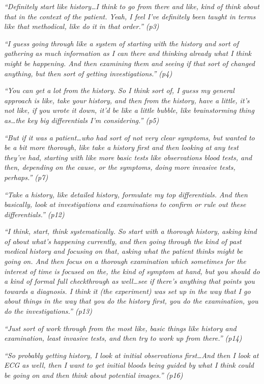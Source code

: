 \documentclass[a4paper, nobind]{templates/ociamthesis}
\begin{document}
\emph{``Definitely start like history\ldots I think to go from there and like, kind of think about that in the context of the patient. Yeah, I feel I've definitely been taught in terms like that methodical, like do it in that order.'' (p3)}

\emph{``I guess going through like a system of starting with the history and sort of gathering as much information as I can there and thinking already what I think might be happening. And then examining them and seeing if that sort of changed anything, but then sort of getting investigations.'' (p4)}

\emph{``You can get a lot from the history. So I think sort of, I guess my general approach is like, take your history, and then from the history, have a little, it's not like, if you wrote it down, it'd be like a little bubble, like brainstorming thing as\ldots the key big differentials I'm considering.'' (p5)}

\emph{``But if it was a patient\ldots who had sort of not very clear symptoms, but wanted to be a bit more thorough, like take a history first and then looking at any test they've had, starting with like more basic tests like observations blood tests, and then, depending on the cause, or the symptoms, doing more invasive tests, perhaps.'' (p7)}

\emph{``Take a history, like detailed history, formulate my top differentials. And then basically, look at investigations and examinations to confirm or rule out these differentials.'' (p12)}

\emph{``I think, start, think systematically. So start with a thorough history, asking kind of about what's happening currently, and then going through the kind of past medical history and focusing on that, asking what the patient thinks might be going on. And then focus on a thorough examination which sometimes for the interest of time is focused on the, the kind of symptom at hand, but you should do a kind of formal full checkthrough as well\ldots see if there's anything that points you towards a diagnosis. I think it (the experiment) was set up in the way that I go about things in the way that you do the history first, you do the examination, you do the investigations.'' (p13)}

\emph{``Just sort of work through from the most like, basic things like history and examination, least invasive tests, and then try to work up from there.'' (p14)}

\emph{``So probably getting history, I look at initial observations first\ldots And then I look at ECG as well, then I want to get initial bloods being guided by what I think could be going on and then think about potential images.'' (p16)}\\
\end{document}
